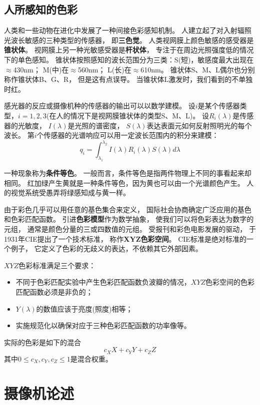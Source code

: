 \subsection{人所感知的色彩}
人类和一些动物在进化中发展了一种间接色彩感知机制。%
人建立起了对入射辐照光波长敏感的三种类型的传感器，%
即\textbf{\color{magenta}三色觉}。%
人类视网膜上颜色敏感的感受器是\textbf{\color{magenta}锥状体}。%
视网膜上另一种光敏感受器是\textbf{\color{magenta}杆状体}，%
专注于在周边光照强度低的情况下的单色感知。%
锥状体按照感知的波长范围分为三类：S(短)，敏感度最大出现在$\approx$430nm；%
M(中)在$\approx$560nm；%
L(长)在$\approx$610nm。%
锥状体S、M、L偶尔也分别称作锥状体B、G、R，%
但是这有点误导。%
当锥状体L激发时，我们看到的不单独时红。

感光器的反应或摄像机种的传感器的输出可以以数学建模。%
设$i$是某个传感器类型，$i=1,2,3$(在人的情况下是视网膜锥状体的类型S、M、L)。%
设$R_{i}(\lambda)$是传感器的光敏度，%
$I(\lambda)$是光照的谱密度，%
$S(\lambda)$表达表面元如何反射照明光的每个波长。%
第$i$个传感器的光谱响应可以用一定波长范围内的积分来建模：
\begin{equation}
  q_{i} = \int_{\lambda_{1}}^{\lambda_{2}}I(\lambda)R_{i}(\lambda)S(\lambda)d\lambda
\end{equation}

一种现象称为\textbf{\color{magenta}条件等色}。%
一般而言，条件等色是指两件物理上不同的事看起来却相同。%
红加绿产生黄就是一种条件等色，因为黄也可以由一个光谱颜色产生。%
人的视觉系统受愚弄将绿感知成与黄一样。

由于彩色几乎可以用任意的基色集合来定义，%
国际社会协商确定广泛应用的基色和色彩匹配函数。%
引进\textbf{\color{magenta}色彩模型}作为数学抽象，%
使我们可以将色彩表达为数字的元组，%
通常是颜色分量的三或四数值的元组。%
受报刊和彩色电影发展的驱动，%
于1931年CIE提出了一个技术标准，%
称作\textbf{\color{magenta}XYZ色彩空间}。
CIE标准是绝对标准的一个例子，%
它定义了色彩的无歧义的表达，不依赖其它外部因素。

$XYZ$色彩标准满足三个要求：
\begin{itemize}
\item{不同于色彩匹配实验中产生色彩匹配函数负波瓣的情况，$XYZ$色彩空间的色彩匹配函数必须是非负的；}
\item{$Y(\lambda)$的数值应该于亮度(照度)相等；}
\item{实施规范化以确保对应于三种色彩匹配函数的功率像等。}
\end{itemize}
实际的色彩是如下的混合
\begin{equation}
  c_{X}X + c_{Y}Y + c_{Z}Z
\end{equation}
其中$0 \leq c_{X}, c_{Y}, c_{Z} \leq 1$是混合权重。





\section{摄像机论述}
